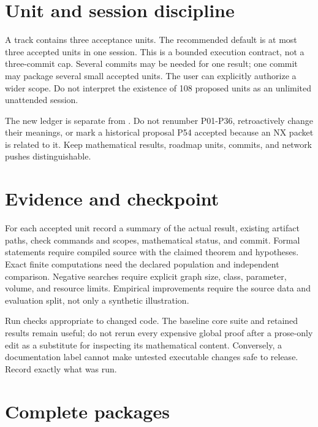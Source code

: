 \documentclass[
  11pt,
  a4paper,
]{report}
\let\nxtexttt\texttt
\renewcommand{\texttt}[1]{\nxtexttt{\seqsplit{#1}}}
\begin{document}
\hypertarget{unit-and-session-discipline}{%
\section{Unit and session
discipline}\label{unit-and-session-discipline}}

A track contains three acceptance units. The recommended default is at
most three accepted units in one session. This is a bounded execution
contract, not a three-commit cap. Several commits may be needed for one
result; one commit may package several small accepted units. The user
can explicitly authorize a wider scope. Do not interpret the existence
of 108 proposed units as an unlimited unattended session.

The new ledger is separate from \texttt{handoff/push\_status.json}. Do
not renumber P01-P36, retroactively change their meanings, or mark a
historical proposal P54 accepted because an NX packet is related to it.
Keep mathematical results, roadmap units, commits, and network pushes
distinguishable.

\hypertarget{evidence-and-checkpoint}{%
\section{Evidence and checkpoint}\label{evidence-and-checkpoint}}

For each accepted unit record a summary of the actual result, existing
artifact paths, check commands and scopes, mathematical status, and
commit. Formal statements require compiled source with the claimed
theorem and hypotheses. Exact finite computations need the declared
population and independent comparison. Negative searches require
explicit graph size, class, parameter, volume, and resource limits.
Empirical improvements require the source data and evaluation split, not
only a synthetic illustration.

Run checks appropriate to changed code. The baseline core suite and
retained results remain useful; do not rerun every expensive global
proof after a prose-only edit as a substitute for inspecting its
mathematical content. Conversely, a documentation label cannot make
untested executable changes safe to release. Record exactly what was
run.

\hypertarget{complete-packages}{%
\section{Complete packages}\label{complete-packages}}
\end{document}
